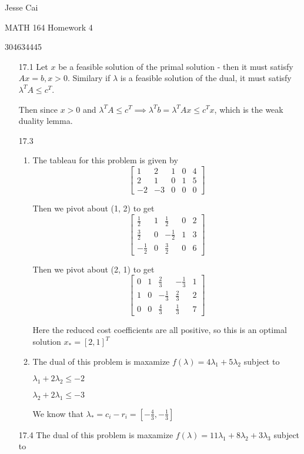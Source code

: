\documentclass[10pt,a4paper]{article}
\newcommand\m[1]{\begin{bmatrix}#1\end{bmatrix}}
\begin{document}
Jesse Cai

MATH 164 Homework 4

304634445

\begin{enumerate}
    \item [17.1] Let $x$ be a feasible solution of the primal solution - then it must satisfy $Ax = b, x >0$. Similary if $\lambda$ is a feasible solution of the dual, it must satisfy $\lambda^T A \leq c^T$.
    
    Then since $x >0$ and $\lambda^TA \leq c^T \implies \lambda^Tb = \lambda^T Ax \leq c^Tx $, which is the weak duality lemma.

    \item [17.3] \begin{enumerate}
        \item The tableau for this problem is given by 
        $$\m{1 & 2 & 1 & 0 & 4 \\
             2 & 1 & 0 & 1 & 5 \\
             -2 & -3 & 0 & 0& 0  }$$

        Then we pivot about (1, 2) to get 
        $$\m{\frac{1}{2} & 1 & \frac{1}{2} & 0 & 2 \\
             \frac{3}{2} & 0 & -\frac{1}{2} & 1 & 3 \\
             -\frac{1}{2} & 0 & \frac{3}{2} & 0 & 6   }$$

        
        Then we pivot about (2, 1) to get 
        $$\m{0 & 1 & \frac{2}{3} & -\frac{1}{3} & 1 \\
             1 & 0 & -\frac{1}{3} & \frac{2}{3} & 2 \\
             0 & 0 & \frac{4}{3} &  \frac{1}{3} & 7   }$$

        Here the reduced cost coefficients are all positive, so this is an optimal solution $x_* = [2, 1]^T$ 
        
        \item  The dual of this problem is maxamize $f(\lambda) = 4\lambda_1 + 5\lambda_2$ subject to

        $\lambda_1 + 2\lambda_2 \leq -2 $

        $\lambda_2 + 2\lambda_1 \leq -3 $
        
        We know that $\lambda_* = c_i - r_i = [-\frac{4}{3}, -\frac{1}{3}]$

    \end{enumerate}
    
    \item[17.4]  The dual of this problem is maxamize $f(\lambda) = 11\lambda_1 + 8\lambda_2 + 3\lambda_3$ subject to


\end{enumerate}
\end{document}
